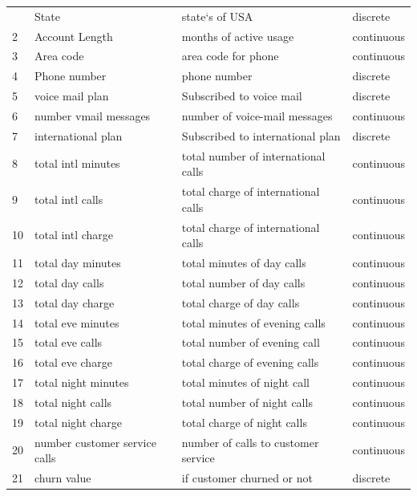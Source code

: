 \begin{center}
\begin{longtable}{l|l|l|l}
		\hline
		\endlastfoot
		1& 		State & 		state`s of USA & 		discrete
		\\
		2& 		Account Length & 		months of active usage & 
		continuous
		\\
		3& 		Area code & 		area code for phone & 		continuous
		\\
		4& 		Phone number & 		phone number  & 		discrete
		\\
		5& 		voice mail plan & 
		Subscribed to voice mail & 
		discrete
		\\
		6& 		number vmail messages & 
		number of voice-mail messages &  
		continuous
		\\
		7& 		international plan & 
		Subscribed to international plan &  
		discrete
		\\
		8& 		total intl minutes &  
		total number of international calls  &  
		continuous
		\\
		9& 		total intl calls & 
		total charge of international calls &  
		continuous
		\\
		10 & 		total intl charge & 
		total charge of international calls &  
		continuous
		\\
		11& 		total day minutes &  total minutes of day calls  &  continuous   \\
		12& 		total day calls & total number of day calls &  continuous   \\
		13& 		total day charge & total charge of day calls &  continuous   \\
		14& 		total eve minutes & total minutes of evening calls &  continuous   \\
		15& 		total eve calls & total number of evening call  &  continuous   \\
		16& 		total eve charge & total charge of evening calls  &  continuous   \\
		17& 		total night minutes & total minutes of night call &  continuous   \\
		18& 		total night calls & total number of night calls &  continuous   \\
		19& 		total night charge & total charge of night calls  &  continuous   \\
		20& 		number customer service calls & number of calls to customer service &  continuous   \\
		21& 		churn value & if customer churned or not & discrete \\
	\end{longtable}
\end{center}



